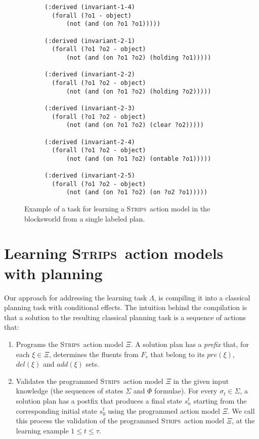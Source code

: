 \documentclass{article}
\newcommand{\strips}{\textsc{Strips}}     %
\begin{document}
\begin{figure}
\begin{footnotesize}
\begin{subfigure}{.6\textwidth}
\begin{verbatim}
(:derived (invariant-1-4)
  (forall (?o1 - object)
      (not (and (on ?o1 ?o1)))))

(:derived (invariant-2-1)
  (forall (?o1 ?o2 - object)
      (not (and (on ?o1 ?o2) (holding ?o1)))))

(:derived (invariant-2-2)
  (forall (?o1 ?o2 - object)
      (not (and (on ?o1 ?o2) (holding ?o2)))))

(:derived (invariant-2-3)
  (forall (?o1 ?o2 - object)
      (not (and (on ?o1 ?o2) (clear ?o2)))))

(:derived (invariant-2-4)
  (forall (?o1 ?o2 - object)
      (not (and (on ?o1 ?o2) (ontable ?o1)))))

(:derived (invariant-2-5)
  (forall (?o1 ?o2 - object)
      (not (and (on ?o1 ?o2) (on ?o2 ?o1)))))
\end{verbatim}
\end{subfigure}%
\end{footnotesize}

 \caption{\small Example of a task for learning a \strips\ action model in the blocksworld from a single labeled plan.}
\label{fig:lexample}
\end{figure}


\section{Learning \strips\ action models with planning}
Our approach for addressing the learning task $\Lambda$, is compiling it into a classical planning task with conditional effects. The intuition behind the compilation is that a solution to the resulting classical planning task is a sequence of actions that:
\begin{enumerate}
\item Programs the \strips\ action model $\Xi$. A solution plan has a {\em prefix} that, for each $\xi\in\Xi$, determines the fluents from $F_v$ that belong to its $pre(\xi)$, $del(\xi)$ and $add(\xi)$ sets.
\item Validates the programmed \strips\ action model $\Xi$ in the given input knowledge (the sequences of states $\Sigma$ and $\Phi$ formulae). For every $\sigma_t\in \Sigma$, a solution plan has a postfix that produces a final state $s_{n}^t$ starting from the corresponding initial state $s_0^t$ using the programmed action model $\Xi$. We call this process the validation of the programmed \strips\ action model $\Xi$, at the learning example {\small $1\leq t\leq \tau$}. %
\end{enumerate}
\end{document}
